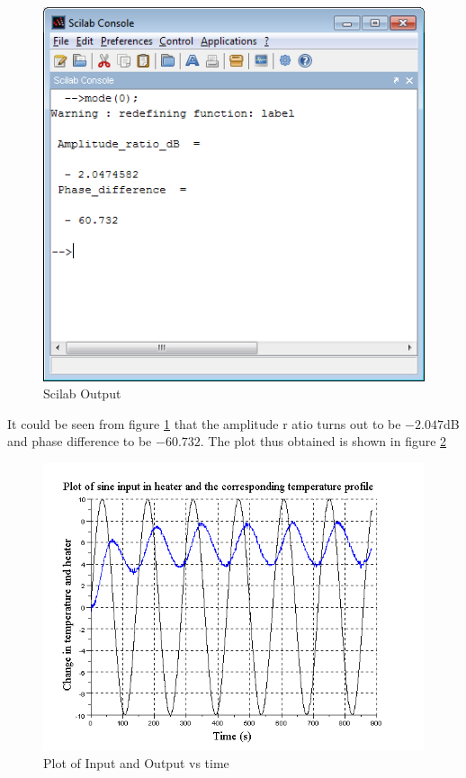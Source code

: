  
\begin{figure}
\includegraphics[width=\linewidth]{sinetest_manual/bode_calc.png}
\caption{Scilab Output}
\label{scilab_op}
\end{figure}
It could be seen from figure \ref{scilab_op} that the amplitude r
atio turns out to be $-2.047$dB and phase difference to be $-60.732$\textdegree.
The plot thus obtained is shown in figure \ref{plot0.4}
\begin{figure}
\includegraphics[width=\linewidth]{sinetest_manual/bode_resp}
\caption{Plot of Input and Output vs time}
\label{plot0.4}
\end{figure}

